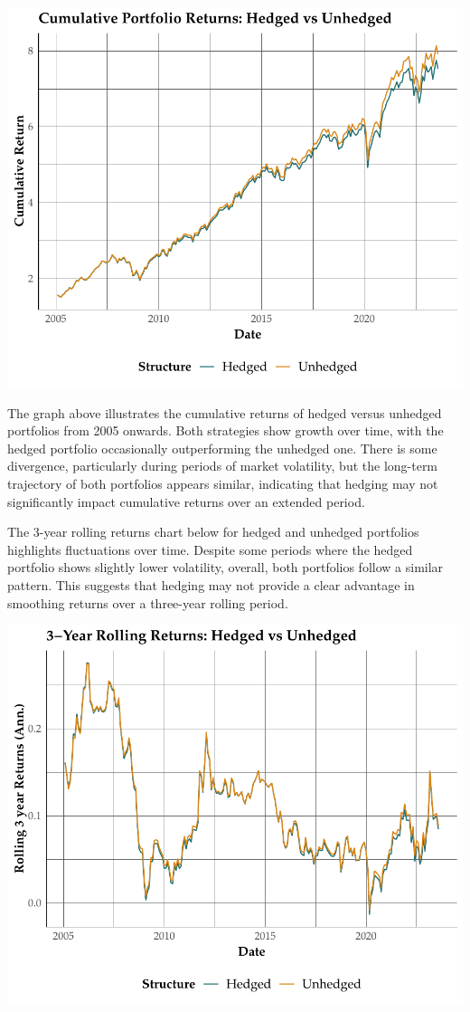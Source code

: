 \documentclass[11pt,preprint, authoryear]{elsarticle}
\numberwithin{equation}{section}
\numberwithin{figure}{section}
\numberwithin{table}{section}
\begin{document}
\includegraphics{Question-2_files/figure-latex/cumrets-1.pdf}

The graph above illustrates the cumulative returns of hedged versus
unhedged portfolios from 2005 onwards. Both strategies show growth over
time, with the hedged portfolio occasionally outperforming the unhedged
one. There is some divergence, particularly during periods of market
volatility, but the long-term trajectory of both portfolios appears
similar, indicating that hedging may not significantly impact cumulative
returns over an extended period.

The 3-year rolling returns chart below for hedged and unhedged
portfolios highlights fluctuations over time. Despite some periods where
the hedged portfolio shows slightly lower volatility, overall, both
portfolios follow a similar pattern. This suggests that hedging may not
provide a clear advantage in smoothing returns over a three-year rolling
period.

\includegraphics{Question-2_files/figure-latex/rollrets-1.pdf}
\end{document}

